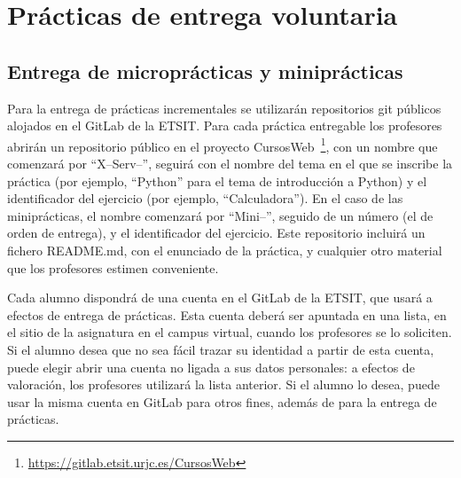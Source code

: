 



\section{Prácticas de entrega voluntaria}

\subsection{Entrega de microprácticas y miniprácticas}
\label{sec:eje-entrega-practicas-incr}

Para la entrega de prácticas incrementales se utilizarán repositorios git públicos alojados en el GitLab de la ETSIT. Para cada práctica entregable los profesores abrirán un repositorio público en el proyecto CursosWeb~\footnote{\url{https://gitlab.etsit.urjc.es/CursosWeb}}, con un nombre que comenzará por ``X--Serv--'', seguirá con el nombre del tema en el que se inscribe la práctica (por ejemplo, ``Python'' para el tema de introducción a Python) y el identificador del ejercicio (por ejemplo, ``Calculadora''). En el caso de las miniprácticas, el nombre comenzará por ``Mini--'', seguido de un número (el de orden de entrega), y el identificador del ejercicio. Este repositorio incluirá un fichero README.md, con el enunciado de la práctica, y cualquier otro material que los profesores estimen conveniente.

Cada alumno dispondrá de una cuenta en el GitLab de la ETSIT, que usará a efectos de entrega de prácticas. Esta cuenta deberá ser apuntada en una lista, en el sitio de la asignatura en el campus virtual, cuando los profesores se lo soliciten. Si el alumno desea que no sea fácil trazar su identidad a partir de esta cuenta, puede elegir abrir una cuenta no ligada a sus datos personales: a efectos de valoración, los profesores utilizará la lista anterior. Si el alumno lo desea, puede usar la misma cuenta en GitLab para otros fines, además de para la entrega de prácticas.

